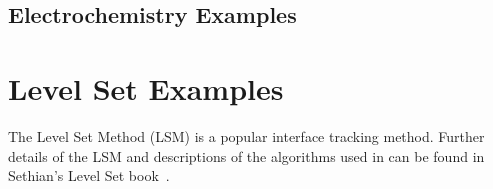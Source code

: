 \documentclass[letterpaper]{book}
\begin{document}




% 

% 
% 
% 
% 
\newpage

\section*{Electrochemistry Examples}






% 





\chapter{Level Set Examples}

The Level Set Method (LSM) is a popular interface tracking
method. Further details of the LSM and descriptions of the algorithms
used in \FiPy{} can be found in Sethian's Level Set
book~\cite{levelSetBook}.


% 

% 


\end{document}
